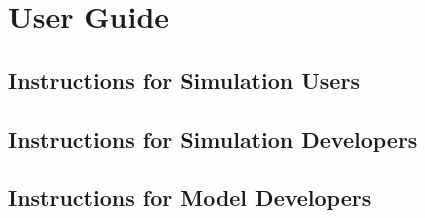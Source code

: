 %
%
%
%
%


\chapter{User Guide}\label{ch:user}

\section{Instructions for Simulation Users}

\section{Instructions for Simulation Developers}

\section{Instructions for Model Developers}
